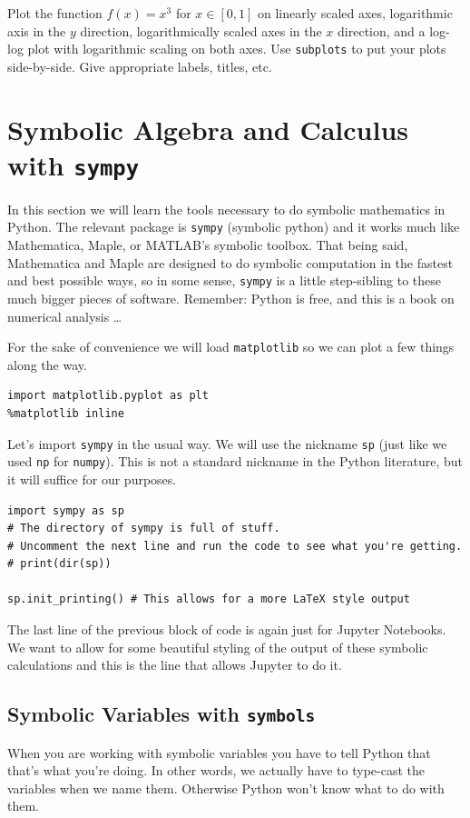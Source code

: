 \begin{problem}
    Plot the function $f(x) = x^3$ for $x \in [0,1]$ on linearly scaled axes, logarithmic
    axis in the $y$ direction, logarithmically scaled axes in the $x$ direction, and a
    log-log plot with logarithmic scaling on both axes.  Use \texttt{subplots} to put your plots side-by-side.  Give appropriate labels, titles, etc.  
\end{problem}

\section{Symbolic Algebra and Calculus with \texttt{sympy}}
In this section we will learn the tools necessary to do symbolic mathematics in Python.
The relevant package is \texttt{sympy} (symbolic python) and it works much like
Mathematica, Maple, or MATLAB's symbolic toolbox.  That being said, Mathematica and Maple
are designed to do symbolic computation in the fastest and best possible ways, so in some
sense, \texttt{sympy} is a little step-sibling to these much bigger pieces of software.
Remember: Python is free, and this is a book on numerical analysis \ldots

For the sake of convenience we will load \texttt{matplotlib} so we can plot a few things
along the way.  

\bcode
\begin{lstlisting}
import matplotlib.pyplot as plt
%matplotlib inline
\end{lstlisting}

Let's import \texttt{sympy} in the usual way.  We will use the nickname \texttt{sp} (just
like we used \texttt{np} for \texttt{numpy}).  This is not a standard nickname in the
Python literature, but it will suffice for our purposes.

\bcode
\begin{lstlisting}
import sympy as sp
# The directory of sympy is full of stuff.  
# Uncomment the next line and run the code to see what you're getting.
# print(dir(sp))

sp.init_printing() # This allows for a more LaTeX style output
\end{lstlisting}
The last line of the previous block of code is again just for Jupyter Notebooks.  We want
to allow for some beautiful styling of the output of these symbolic calculations and this
is the line that allows Jupyter to do it.



\subsection{Symbolic Variables with \texttt{symbols}}
When you are working with symbolic variables you have to tell Python that that's what
you're doing.  In other words, we actually have to type-cast the variables when we name
them.  Otherwise Python won't know what to do with them.

